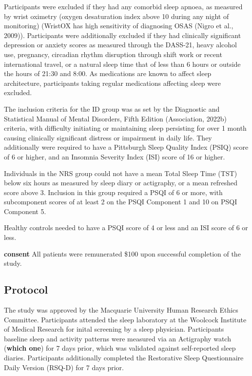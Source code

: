 \documentclass[
]{article}
\begin{document}
Participants were excluded if they had any comorbid sleep apnoea, as
measured by wrist oximetry (oxygen desaturation index above 10 during
any night of monitoring) (WristOX has high sensitivity of diagnosing
OSAS (Nigro et al., 2009)). Participants were additionally excluded if
they had clinically significant depression or anxiety scores as measured
through the DASS-21, heavy alcohol use, pregnancy, circadian rhythm
disruption through shift work or recent international travel, or a
natural sleep time that of less than 6 hours or outside the hours of
21:30 and 8:00. As medications are known to affect sleep architecture,
participants taking regular medications affecting sleep were excluded.

The inclusion criteria for the ID group was as set by the Diagnostic and
Statistical Manual of Mental Disorders, Fifth Edition (Association,
2022b) criteria, with difficulty initiating or maintaining sleep
persisting for over 1 month causing clinically significant distress or
impairment in daily life. They additionally were required to have a
Pittsburgh Sleep Quality Index (PSIQ) score of 6 or higher, and an
Insomnia Severity Index (ISI) score of 16 or higher.

Individuals in the NRS group could not have a mean Total Sleep Time
(TST) below six hours as measured by sleep diary or actigraphy, or a
mean refreshed score above 3. Inclusion in this group required a PSQI of
6 or more, with subcomponent scores of at least 2 on the PSQI Component
1 and 10 on PSQI Component 5.

Healthy controls needed to have a PSQI score of 4 or less and an ISI
score of 6 or less.

\textbf{consent} All patients were remunerated \$100 upon successful
completion of the study.

\subsection{Protocol}\label{protocol}

The study was approved by the Macquarie University Human Research Ethics
Committee. Participants attended the sleep laboratory at the Woolcock
Institute of Medical Research for inital screening by a sleep physician.
Participants baseline sleep and activity patterns were measured via an
Actigraphy watch (\textbf{which one}) for 7 days prior, which was
validated against self-reported sleep diaries. Participants additionally
completed the Restorative Sleep Questionnaire Daily Version (RSQ-D) for
7 days prior.
\end{document}
